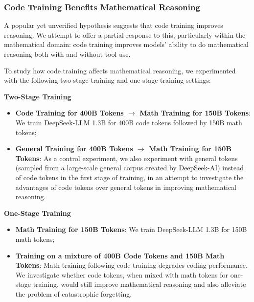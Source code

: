 \subsubsection{Code Training Benefits Mathematical Reasoning}

A popular yet unverified hypothesis suggests that code training improves reasoning.
We attempt to offer a partial response to this, particularly within the mathematical domain:
code training improves models' ability to do mathematical reasoning both with and without tool use.

To study how code training affects mathematical reasoning, we experimented with the following two-stage training and one-stage training settings:

\noindent
\textbf{Two-Stage Training} 
\begin{itemize}[topsep=0pt]
    \item \textbf{Code Training for 400B Tokens $\rightarrow$ Math Training for 150B Tokens}:
    We train DeepSeek-LLM 1.3B for 400B code tokens followed by 150B math tokens;
    \item \textbf{General Training for 400B Tokens $\rightarrow$ Math Training for 150B Tokens}:
    As a control experiment, we also experiment with general tokens (sampled from a large-scale general corpus created by DeepSeek-AI) instead of code tokens in the first stage of training, in an attempt to investigate the advantages of code tokens over general tokens in improving mathematical reasoning.
\end{itemize}

\noindent
\textbf{One-Stage Training}
\begin{itemize}[topsep=0pt]
    \item \textbf{Math Training for 150B Tokens}:
    We train DeepSeek-LLM 1.3B for 150B math tokens;
    \item \textbf{Training on a mixture of 400B Code Tokens and 150B Math Tokens}:
    Math training following code training degrades coding performance.
    We investigate whether code tokens, when mixed with math tokens for one-stage training, would still improve mathematical reasoning and also alleviate the problem of catastrophic forgetting.
\end{itemize}

